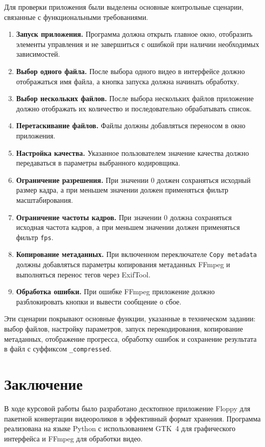 \documentclass[14pt,a4paper]{extarticle}
\begin{document}
Для проверки приложения были выделены основные контрольные сценарии, связанные с функциональными требованиями.
\begin{enumerate}
	\item \textbf{Запуск приложения.} Программа должна открыть главное окно, отобразить элементы управления и не завершиться с ошибкой при наличии необходимых зависимостей.
	\item \textbf{Выбор одного файла.} После выбора одного видео в интерфейсе должно отображаться имя файла, а кнопка запуска должна начинать обработку.
	\item \textbf{Выбор нескольких файлов.} После выбора нескольких файлов приложение должно отображать их количество и последовательно обрабатывать список.
	\item \textbf{Перетаскивание файлов.} Файлы должны добавляться переносом в окно приложения.
	\item \textbf{Настройка качества.} Указанное пользователем значение качества должно передаваться в параметры выбранного кодировщика.
	\item \textbf{Ограничение разрешения.} При значении 0 должен сохраняться исходный размер кадра, а при меньшем значении должен применяться фильтр масштабирования.
	\item \textbf{Ограничение частоты кадров.} При значении 0 должна сохраняться исходная частота кадров, а при меньшем значении должен применяться фильтр \texttt{fps}.
	\item \textbf{Копирование метаданных.} При включенном переключателе \texttt{Copy metadata} должны добавляться параметры копирования метаданных FFmpeg и выполняться перенос тегов через ExifTool.
	\item \textbf{Обработка ошибки.} При ошибке FFmpeg приложение должно разблокировать кнопки и вывести сообщение о сбое.
\end{enumerate}

Эти сценарии покрывают основные функции, указанные в техническом задании: выбор файлов, настройку параметров, запуск перекодирования, копирование метаданных, отображение прогресса, обработку ошибок и сохранение результата в файл с суффиксом \texttt{\_compressed}.

\section{Заключение}

В ходе курсовой работы было разработано десктопное приложение Floppy для пакетной конвертации видеороликов в эффективный формат хранения. Программа реализована на языке Python с использованием GTK~4 для графического интерфейса и FFmpeg для обработки видео.
\end{document}
